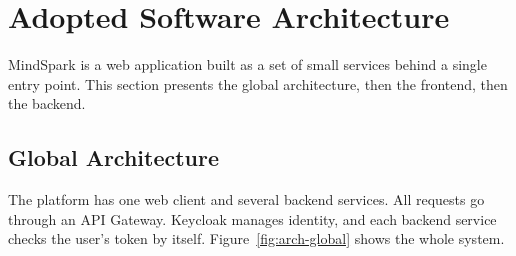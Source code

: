\documentclass[12pt,a4paper]{report}
\begin{document}
\section{Adopted Software Architecture}
\label{sec:architecture}

MindSpark is a web application built as a set of small services behind a single entry point. This section presents the global architecture, then the frontend, then the backend.

\subsection{Global Architecture}
\label{subsec:arch-global}

The platform has one web client and several backend services. All requests go through an API Gateway. Keycloak manages identity, and each backend service checks the user's token by itself. Figure~\ref{fig:arch-global} shows the whole system.
\end{document}
